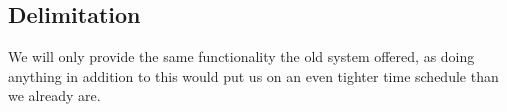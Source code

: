 \subsection{Delimitation}
We will only provide the same functionality the old system offered, as doing anything in addition to this would put us on an even tighter time schedule than we already are.
